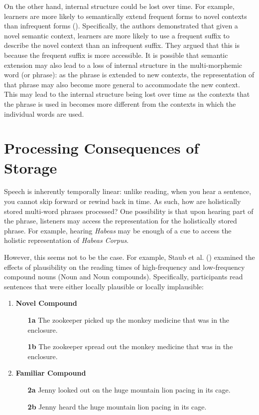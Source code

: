 \documentclass[
  12pt,
  letterpaper,
]{scrreport}
\begin{document}
On the other hand, internal structure could be lost over time. For
example, learners are more likely to semantically extend frequent forms
to novel contexts than infrequent forms
().
Specifically, the authors demonstrated that given a novel semantic
context, learners are more likely to use a frequent suffix to describe
the novel context than an infrequent suffix. They argued that this is
because the frequent suffix is more accessible. It is possible that
semantic extension may also lead to a loss of internal structure in the
multi-morphemic word (or phrase): as the phrase is extended to new
contexts, the representation of that phrase may also become more general
to accommodate the new context. This may lead to the internal structure
being lost over time as the contexts that the phrase is used in becomes
more different from the contexts in which the individual words are used.

\section{Processing Consequences of
Storage}\label{sec-processing-consequences-of-storage}

Speech is inherently temporally linear: unlike reading, when you hear a
sentence, you cannot skip forward or rewind back in time. As such, how
are holistically stored multi-word phrases processed? One possibility is
that upon hearing part of the phrase, listeners may access the
representation for the holistically stored phrase. For example, hearing
\emph{Habeas} may be enough of a cue to access the holistic
representation of \emph{Habeas Corpus}.

However, this seems not to be the case. For example, Staub et al.
() examined the
effects of plausibility on the reading times of high-frequency and
low-frequency compound nouns (Noun and Noun compounds). Specifically,
participants read sentences that were either locally plausible or
locally implausible:

\begin{enumerate} 
    \item \textbf{Novel Compound}
    \begin{enumerate}
        \item[\textbf{1a}] The zookeeper picked up the monkey medicine that was in the enclosure.
        \item[\textbf{1b}] The zookeeper spread out the monkey medicine that was in the enclosure.
    \end{enumerate}
    \item \textbf{Familiar Compound}
    \begin{enumerate}
        \item[\textbf{2a}] Jenny looked out on the huge mountain lion pacing in its cage.
        \item[\textbf{2b}] Jenny heard the huge mountain lion pacing in its cage.
    \end{enumerate}
\end{enumerate}
\end{document}
